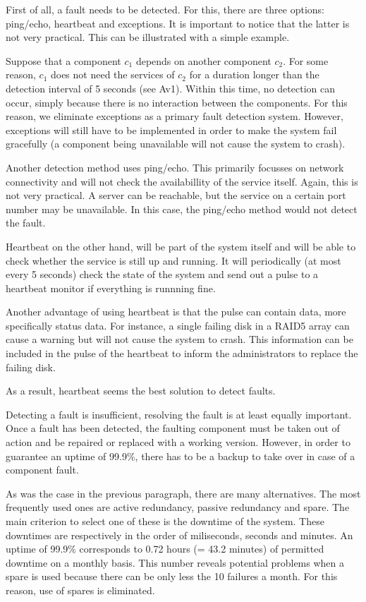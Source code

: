\npar First of all, a fault needs to be detected. For this, there are three
options: ping/echo, heartbeat and exceptions. It is important to notice that the
latter is not very practical. This can be illustrated with a simple example.

\npar Suppose that a component $c_1$ depends on another component $c_2$. For
some reason, $c_1$ does not need the services of $c_2$ for a duration longer
than the detection interval of 5 seconds (see Av1). Within this time, no
detection can occur, simply because there is no interaction between the
components. For this reason, we eliminate exceptions as a primary fault
detection system. However, exceptions will still have to be implemented in order
to make the system fail gracefully (a component being unavailable will not
cause the system to crash).

\npar Another detection method uses ping/echo. This primarily focusses on
network connectivity and will not check the availabillity of the service itself.
Again, this is not very practical. A server can be reachable, but the service on
a certain port number may be unavailable. In this case, the ping/echo
method would not detect the fault. 

\npar Heartbeat on the other hand, will be part of the system itself and will be
able to check whether the service is still up and running. It will periodically
(at most every 5 seconds) check the state of the system and send out a pulse
to a heartbeat monitor if everything is runnning fine.

\npar Another advantage of using heartbeat is that the pulse can contain data,
more specifically status data. For instance, a single failing disk in a RAID5
array can cause a warning but will not cause the system to crash. This
information can be included in the pulse of the heartbeat to inform the
administrators to replace the failing disk.

\npar As a result, heartbeat seems the best solution to detect faults. 

\npar Detecting a fault is insufficient, resolving the fault is at least equally
important. Once a fault has been detected, the faulting component must be taken
out of action and be repaired or replaced with a working version. However, in
order to guarantee an uptime of 99.9\%, there has to be a backup to take over in
case of a component fault.

\npar As was the case in the previous paragraph, there are many alternatives.
The most frequently used ones are active redundancy, passive redundancy and
spare. The main criterion to select one of these is the downtime of the system.
These downtimes are respectively in the order of miliseconds, seconds and
minutes. An uptime of 99.9\% corresponds to 0.72 hours (= 43.2 minutes) of
permitted downtime on a monthly basis. This number reveals potential problems
when a spare is used because there can be only less the 10 failures a month. For
this reason, use of spares is eliminated.

